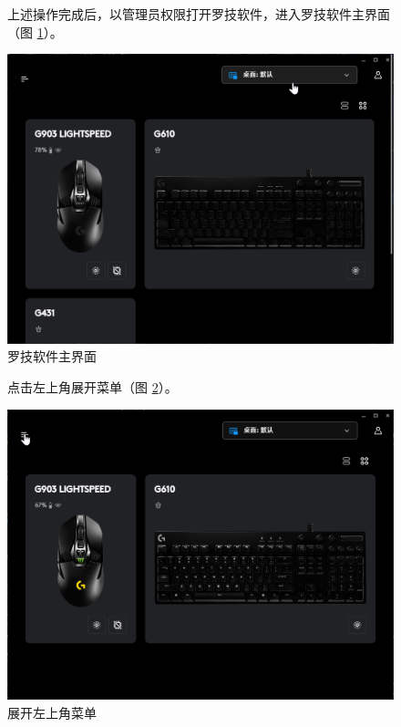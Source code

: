 \begin{figure}[H]
    \Centering
    \parbox[l]{\textwidth}{上述操作完成后，以管理员权限打开罗技软件，进入罗技软件主界面（图 \ref{ch0fig-lghub}）。}
    \includegraphics[width=\textwidth]{docs/assets/intro/lghub.png}
    \caption{罗技软件主界面}
    \label{ch0fig-lghub}
\end{figure}

\begin{figure}[H]
    \Centering
    \parbox[l]{\textwidth}{点击左上角展开菜单（图 \ref{ch0fig-lghub-menu}）。}
    \includegraphics[width=\textwidth]{docs/assets/intro/lghub_menu.png}
    \caption{展开左上角菜单}
    \label{ch0fig-lghub-menu}
\end{figure}

